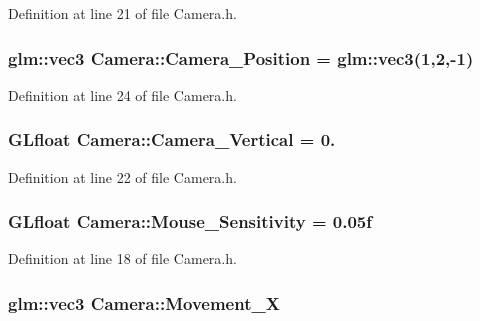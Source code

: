 Definition at line 21 of file Camera.\+h.

\hypertarget{class_camera_a95720b391db9ebf7c89099e317a1457b}{}
\subsubsection[{Camera\+\_\+\+Position}]{\setlength{\rightskip}{0pt plus 5cm}glm\+::vec3 Camera\+::\+Camera\+\_\+\+Position = glm\+::vec3(1,2,-\/1)}\label{class_camera_a95720b391db9ebf7c89099e317a1457b}


Definition at line 24 of file Camera.\+h.

\hypertarget{class_camera_a7ca0772371495e93f9054b5fa3731294}{}
\subsubsection[{Camera\+\_\+\+Vertical}]{\setlength{\rightskip}{0pt plus 5cm}G\+Lfloat Camera\+::\+Camera\+\_\+\+Vertical = 0.}\label{class_camera_a7ca0772371495e93f9054b5fa3731294}


Definition at line 22 of file Camera.\+h.

\hypertarget{class_camera_ada530cf7b97b15431c729ddc3435d702}{}
\subsubsection[{Mouse\+\_\+\+Sensitivity}]{\setlength{\rightskip}{0pt plus 5cm}G\+Lfloat Camera\+::\+Mouse\+\_\+\+Sensitivity = 0.\+05f}\label{class_camera_ada530cf7b97b15431c729ddc3435d702}


Definition at line 18 of file Camera.\+h.

\hypertarget{class_camera_aeb46eafc5ef6dbbc36667236f3dc3356}{}
\subsubsection[{Movement\+\_\+\+X}]{\setlength{\rightskip}{0pt plus 5cm}glm\+::vec3 Camera\+::\+Movement\+\_\+\+X}\label{class_camera_aeb46eafc5ef6dbbc36667236f3dc3356}


